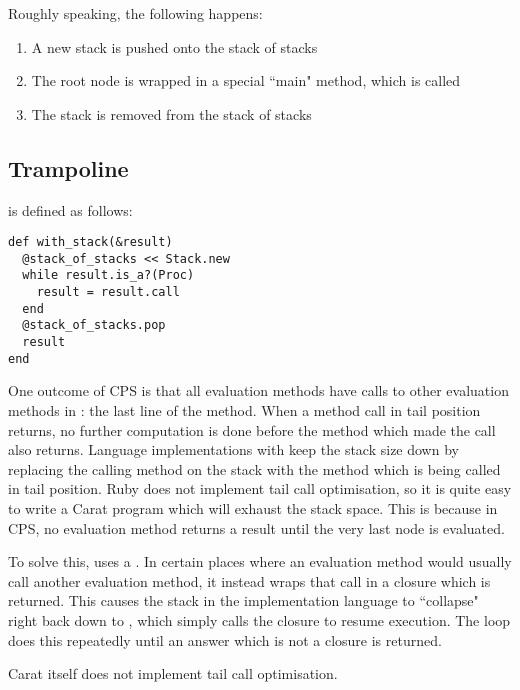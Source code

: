 Roughly speaking, the following happens:

\begin{enumerate}
  \item A new stack is pushed onto the stack of stacks
  \item The root node is wrapped in a special ``main" method, which is called
  \item The stack is removed from the stack of stacks
\end{enumerate}

\subsection{Trampoline}

 is defined as follows:

\begin{minipage}{\textwidth}
\begin{lstlisting}
def with_stack(&result)
  @stack_of_stacks << Stack.new
  while result.is_a?(Proc)
    result = result.call
  end
  @stack_of_stacks.pop
  result
end
\end{lstlisting}
\end{minipage}

One outcome of CPS is that all evaluation methods have calls to other evaluation methods in : the last line of the method. When a method call in tail position returns, no further computation is done before the method which made the call also returns. Language implementations with  keep the stack size down by replacing the calling method on the stack with the method which is being called in tail position. Ruby does not implement tail call optimisation, so it is quite easy to write a Carat program which will exhaust the stack space. This is because in CPS, no evaluation method returns a result until the very last node is evaluated.

To solve this,  uses a . In certain places where an evaluation method would usually call another evaluation method, it instead wraps that call in a closure which is returned. This causes the stack in the implementation language to ``collapse" right back down to , which simply calls the closure to resume execution. The  loop does this repeatedly until an answer which is not a closure is returned.

Carat itself does not implement tail call optimisation.

